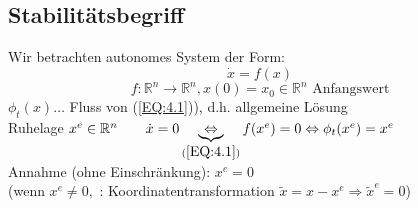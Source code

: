 \documentclass[11pt,a4paper]{article}
\begin{document}
\subsection{Stabilitätsbegriff}
Wir betrachten autonomes System der Form: \begin{equation}\dot x = f(x)\tag{4.1}
\label{EQ:4.1}
\end{equation}
\begin{equation*}
f: \mathbb{R}^n \rightarrow \mathbb{R}^n, x(0) = x_0 \in \mathbb{R}^n \text{ Anfangswert}
\end{equation*}
$\phi_t(x) \dots $ Fluss von (\ref{EQ:4.1})), d.h. allgemeine Lösung
\\Ruhelage $x^e \in \mathbb{R}^n \qquad 
\dot x = 0 \underbrace{\Leftrightarrow}_{(\ref{EQ:4.1})} f(x^e)= 0 \Leftrightarrow \phi_t(x^e)=x^e
$\\
Annahme (ohne Einschränkung): $x^e=0$\\
(wenn $x^e \ne 0, $ : Koordinatentransformation $\tilde x = x- x^e \Rightarrow \tilde x^e = 0 $)
\\
\end{document}
